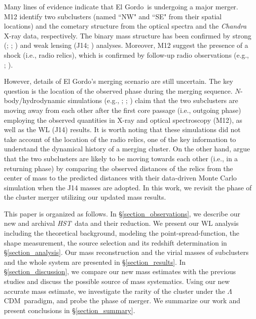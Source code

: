 \documentclass[twocolumn]{aastex631}
\newcommand{\elgordo}{El Gordo}
\newcommand{\LCDM}{$\Lambda$CDM}
\newcommand{\HST}{{\it HST}}
\begin{document}
Many lines of evidence indicate that \elgordo~is undergoing a major merger. 
M12 identify two subclusters (named ``NW" and ``SE" from their spatial locations) and the cometary structure from the optical spectra and the \emph{Chandra} X-ray data, respectively. 
The binary mass structure has been confirmed by strong (\citealt{Zitrin2013}; \citealt{Cerny2018}; \citealt{Diego2020}) and weak lensing (J14; \citealt{Schrabback2018}) analyses. 
Moreover, M12 suggest the presence of a shock (i.e., radio relics), which is confirmed by follow-up radio observations (e.g., \citealt{Lindner2014}; \citealt{Basu2016}). 


However, details of \elgordo's merging scenario are still uncertain. 
The key question is the location of the observed phase during the merging sequence. $N$-body/hydrodynamic simulations (e.g., \citealt{Donnert2014}; \citealt{Molnar2015}; \citealt{Zhang2015}) claim that the two subclusters are moving away from each other after the first core passage (i.e., outgoing phase) employing the observed quantities in X-ray and optical spectroscopy (M12), as well as the WL (J14) results. 
It is worth noting that these simulations did not take account of the location of the radio relics, one of the key information to understand the dynamical history of a merging cluster. 
On the other hand, \cite{Ng2015} argue that the two subclusters are likely to be moving towards each other (i.e., in a returning phase) by comparing the observed distances of the relics from the center of mass to the predicted distances with their data-driven Monte Carlo simulation when the J14 masses are adopted. 
In this work, we revisit the phase of the cluster merger utilizing our updated mass results. 


This paper is organized as follows. 
In \S\ref{section_observations}, we describe our new and archival \HST~data and their reduction. 
We present our WL analysis including the theoretical background, modeling the point-spread-function, the shape measurement, the source selection and its redshift determination in \S\ref{section_analysis}. 
Our mass reconstruction and the virial masses of subclusters and the whole system are presented in \S\ref{section_results}. 
In \S\ref{section_discussion}, we compare our new mass estimates with the previous studies and discuss the possible source of mass systematics. Using our new accurate mass estimate, we investigate the rarity of the cluster under the \LCDM~paradigm, and probe the phase of merger. 
We summarize our work and present conclusions in \S\ref{section_summary}. 
\end{document}
